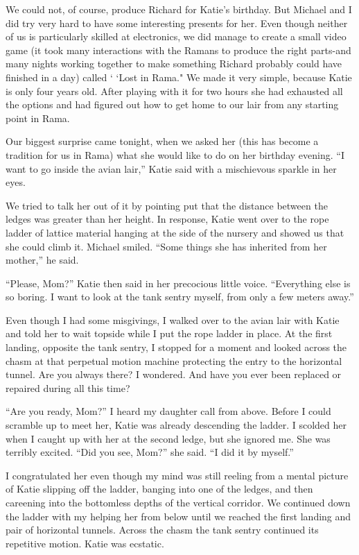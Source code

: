 \documentclass[]{article}
\begin{document}
We could not, of course, produce Richard for Katie’s birthday.  But Michael and I did try very hard to have some interesting presents for her.  Even though neither of us is particularly skilled at electronics, we did manage to create a small video game (it took many interactions with the Ramans to produce the right parts-and many nights working together to make something Richard probably could have finished in a day) called ‘ ‘Lost in Rama."  We made it very simple, because Katie is only four years old.  After playing with it for two hours she had exhausted all the options and had figured out how to get home to our lair from any starting point in Rama.

Our biggest surprise came tonight, when we asked her (this has become a tradition for us in Rama) what she would like to do on her birthday evening.  “I want to go inside the avian lair,” Katie said with a mischievous sparkle in her eyes.

We tried to talk her out of it by pointing put that the distance between the ledges was greater than her height.  In response, Katie went over to the rope ladder of lattice material hanging at the side of the nursery and showed us that she could climb it.  Michael smiled.  “Some things she has inherited from her mother,” he said.

“Please, Mom?” Katie then said in her precocious little voice.  “Everything else is so boring.  I want to look at the tank sentry myself, from only a few meters away.”

Even though I had some misgivings, I walked over to the avian lair with Katie and told her to wait topside while I put the rope ladder in place.  At the first landing, opposite the tank sentry, I stopped for a moment and looked across the chasm at that perpetual motion machine protecting the entry to the horizontal tunnel.  Are you always there? I wondered.  And have you ever been replaced or repaired during all this time?

“Are you ready, Mom?” I heard my daughter call from above.  Before I could scramble up to meet her, Katie was already descending the ladder.  I scolded her when I caught up with her at the second ledge, but she ignored me.  She was terribly excited.  “Did you see, Mom?” she said.  “I did it by myself.”

I congratulated her even though my mind was still reeling from a mental picture of Katie slipping off the ladder, banging into one of the ledges, and then careening into the bottomless depths of the vertical corridor.  We continued down the ladder with my helping her from below until we reached the first landing and pair of horizontal tunnels.  Across the chasm the tank sentry continued its repetitive motion.  Katie was ecstatic.
\end{document}
